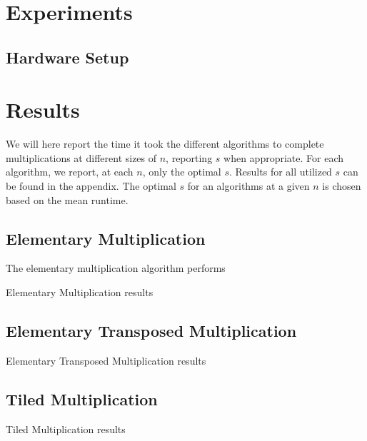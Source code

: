 \documentclass[12pt, a4paper]{article}
\begin{document}
\section{Experiments}

\subsection{Hardware Setup}


\section{Results}
We will here report the time it took the different algorithms to complete multiplications at different sizes of $n$, reporting $s$ when appropriate. For each algorithm, we report, at each $n$, only the optimal $s$. Results for all utilized $s$ can be found in the appendix. The optimal $s$ for an algorithms at a given $n$ is chosen based on the mean runtime.

\subsection{Elementary Multiplication}
The elementary multiplication algorithm performs 
\begin{table}[p]
\begin{center}
\label{tbl:horse_ele}

\caption{Elementary Multiplication results}
\end{center}
\end{table}

\subsection{Elementary Transposed Multiplication}
\begin{table}[p]
\begin{center}
\label{tbl:horse_trans}

\caption{Elementary Transposed Multiplication results}
\end{center}
\end{table}

\subsection{Tiled Multiplication}
\begin{table}[p]
\begin{center}
\label{tbl:horse_tiled}

\caption{Tiled Multiplication results}
\end{center}
\end{table}
\end{document}
